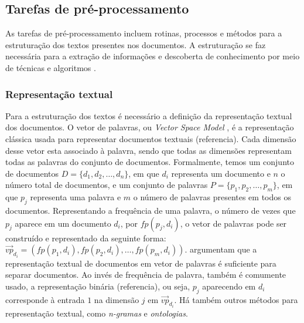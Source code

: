 \documentclass[normaltoc, espacoumemeio, pnumromarab,ruledheader]{abnt}
\begin{document}
    \subsection{Tarefas de pré-processamento}

    As tarefas de pré-processamento incluem rotinas, processos e métodos para a estruturação dos textos presentes nos documentos.
    A estruturação se faz necessária para a extração de informações e descoberta de conhecimento por meio de técnicas e algoritmos \cite{Hotho2005}.

    \subsubsection{Representação textual}

    Para a estruturação dos textos é necessário a definição da representação textual dos documentos.
    O vetor de palavras, ou \textit{Vector Space Model} \cite{Salton1975}, é a representação clássica usada para representar documentos textuais (referencia). Cada dimensão desse vetor esta associado à palavra, sendo que todas as dimensões representam todas as palavras do conjunto de documentos.
    Formalmente, temos um conjunto de documentos $D = \{ d_1, d_2, \dots, d_n \}$, em que $d_i$ representa um documento e $n$ o número total de documentos, e um conjunto de palavras $P = \{ p_1, p_2, \dots, p_m \}$, em que $p_j$ representa uma palavra e $m$ o número de palavras presentes em todos os documentos.
    Representando a frequência de uma palavra, o número de vezes que $p_j$ aparece em um documento $d_i$, por $fp(p_j, d_i)$, o vetor de palavras pode ser construído e representado da seguinte forma: $\vec{vp}_{d_i} = ( fp(p_1, d_i), fp(p_2, d_i), \dots, fp(p_m, d_i) )$.
     argumentam que a representação textual de documentos em vetor de palavras é suficiente para separar documentos.
    Ao invés de frequência de palavra, também é comumente usado, a representação binária (referencia), ou seja, $p_j$ aparecendo em $d_i$ corresponde à entrada $1$ na dimensão $j$ em $\vec{vp}_{d_i}$.
    Há também outros métodos para representação textual, como \textit{n-gramas} e \textit{ontologias}.
\end{document}
